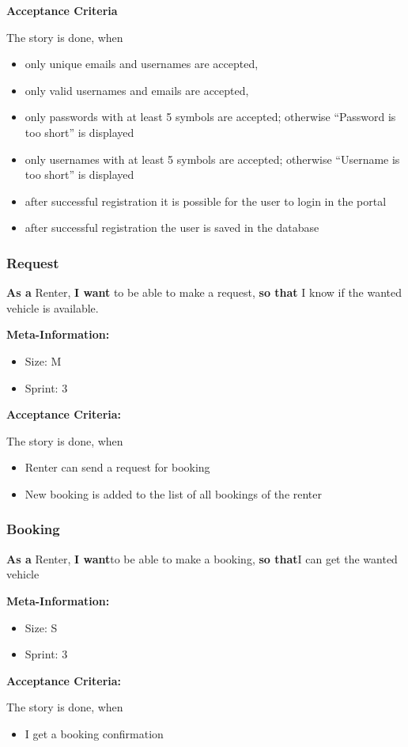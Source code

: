 \textbf{Acceptance Criteria}

The story is done, when
\begin{itemize}
    \item only unique emails and usernames are accepted,
    \item only valid usernames and emails are accepted,
    \item only passwords with at least 5 symbols are accepted; otherwise “Password is too short” is displayed
    \item only usernames with at least 5 symbols are accepted; otherwise “Username is too short” is displayed
    \item after successful registration it is possible for the user to login in the portal
    \item after successful registration the user is saved in the database
\end{itemize}


\subsubsection{Request}

\textbf{As a} Renter,\hfill\break
\textbf{I want} to be able to make a request,\hfill\break
\textbf{so that} I know if the wanted vehicle is available.

\textbf{Meta-Information:}
\begin{itemize}
    \item Size: M
    \item Sprint: 3
\end{itemize}

\textbf{Acceptance Criteria:}

The story is done, when
\begin{itemize}
    \item Renter can send a request for booking
    \item New booking is added to the list of all bookings of the renter
\end{itemize}

\subsubsection{Booking}

\textbf{As a} Renter,\hfill\break
\textbf{I want}to be able to make a booking,\hfill\break
\textbf{so that}I can get the wanted vehicle

\textbf{Meta-Information:}
\begin{itemize}
    \item Size: S
    \item Sprint: 3
\end{itemize}

\textbf{Acceptance Criteria:}

The story is done, when
\begin{itemize}
    \item I get a booking confirmation
\end{itemize}